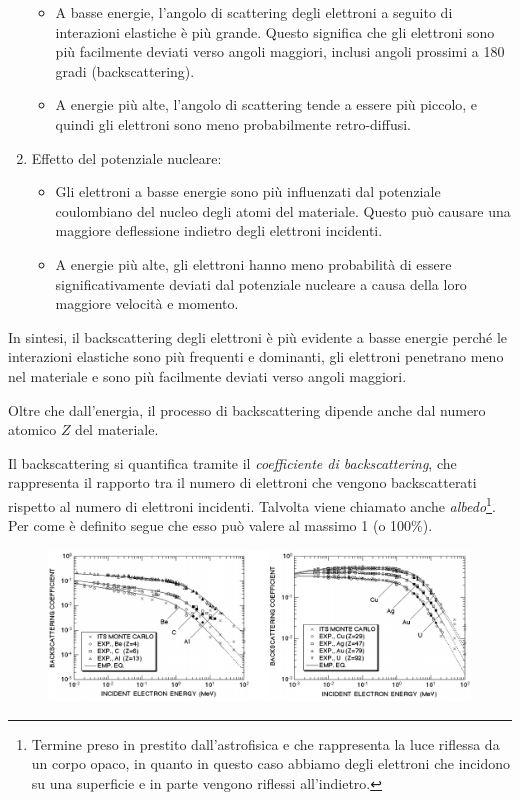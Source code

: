 \begin{approfondimento}
\begin{enumerate}[leftmargin=0.6cm]
        \begin{itemize}[leftmargin=0pt]
            \item A basse energie, l'angolo di scattering degli elettroni a seguito di interazioni elastiche è più grande. Questo significa che gli elettroni sono più facilmente deviati verso angoli maggiori, inclusi angoli prossimi a 180 gradi (backscattering).
            \item A energie più alte, l'angolo di scattering tende a essere più piccolo, e quindi gli elettroni sono meno probabilmente retro-diffusi.
        \end{itemize}
        \item Effetto del potenziale nucleare:
        \begin{itemize}[leftmargin=0pt]
            \item Gli elettroni a basse energie sono più influenzati dal potenziale coulombiano del nucleo degli atomi del materiale. Questo può causare una maggiore deflessione indietro degli elettroni incidenti.
            \item A energie più alte, gli elettroni hanno meno probabilità di essere significativamente deviati dal potenziale nucleare a causa della loro maggiore velocità e momento.
        \end{itemize}
    \end{enumerate}
    In sintesi, il backscattering degli elettroni è più evidente a basse energie perché le interazioni elastiche sono più frequenti e dominanti, gli elettroni penetrano meno nel materiale e sono più facilmente deviati verso angoli maggiori.
\end{approfondimento}

Oltre che dall'energia, il processo di backscattering dipende anche dal numero atomico $Z$ del materiale.

Il backscattering si quantifica tramite il \textit{coefficiente di backscattering}, che rappresenta il rapporto tra il numero di elettroni che vengono backscatterati rispetto al numero di elettroni incidenti. Talvolta viene chiamato anche \textit{albedo}\footnote{Termine preso in prestito dall'astrofisica e che rappresenta la luce riflessa da un corpo opaco, in quanto in questo caso abbiamo degli elettroni che incidono su una superficie e in parte vengono riflessi all'indietro.}. Per come è definito segue che esso può valere al massimo 1 (o 100\%).

\begin{figure}[H]
    \centering
    \includegraphics[width=\textwidth]{immagini/esempi_backscattering.png}
\end{figure}

